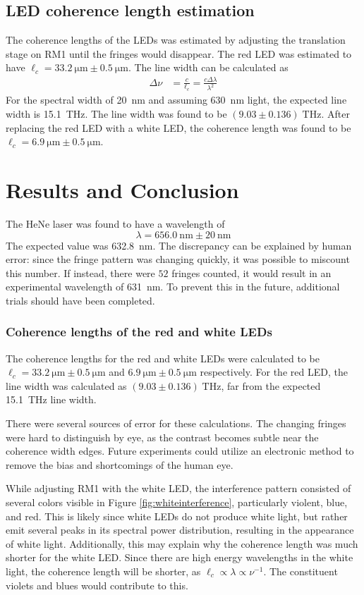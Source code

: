 \documentclass[notitlepage]{report}
\begin{document}
	\subsection{LED coherence length estimation}
	The coherence lengths of the LEDs was estimated by adjusting the translation stage on RM1 until the fringes would disappear. The red LED was estimated to have $\ell_c = \SI{33.2}{\um} \pm \SI{0.5}{\um}$. 
	The line width can be calculated as \begin{align}
		\Delta \nu & = \frac{c}{\ell_c} = \frac{c\Delta \lambda}{\lambda^2} \label{eq:linewidth}
	\end{align}
	For the spectral width of \SI{20}{\nm} and assuming \SI{630}{\nm} light, the expected line width is \SI{15.1}{\THz}. The line width was found to be $(9.03 \pm 0.136) \; \si{\THz}$. After replacing the red LED with a white LED, the coherence length was found to be $\ell_c = \SI{6.9}{\um} \pm \SI{0.5}{\um}$. 
	
	\section{Results and Conclusion}
	The HeNe laser was found to have a wavelength of $$\lambda = \SI{656.0}{\nm} \pm \SI{20}{\nm}$$
	The expected value was \SI{632.8}{\nm}. The discrepancy can be explained by human error: since the fringe pattern was changing quickly, it was possible to miscount this number. If instead, there were $52$ fringes counted, it would result in an experimental wavelength of \SI{631}{\nm}. To prevent this in the future, additional trials should have been completed. 
	
	
	\subsubsection{Coherence lengths of the red and white LEDs}
	The coherence lengths for the red and white LEDs were calculated to be $\ell_c = \SI{33.2}{\um} \pm \SI{0.5}{\um}$ and $\SI{6.9}{\um} \pm \SI{0.5}{\um}$ respectively. For the red LED, the line width was calculated as $(9.03 \pm 0.136) \; \si{\THz}$, far from the expected \SI{15.1}{\THz} line width.
	
	
	There were several sources of error for these calculations. The changing fringes were hard to distinguish by eye, as the contrast becomes subtle near the coherence width edges. Future experiments could utilize an electronic method to remove the bias and shortcomings of the human eye. 
	
	While adjusting RM1 with the white LED, the interference pattern consisted of several colors visible in Figure \ref{fig:whiteinterference}, particularly violent, blue, and red. This is likely since white LEDs do not produce white light, but rather emit several peaks in its spectral power distribution, resulting in the appearance of white light. Additionally, this may explain why the coherence length was much shorter for the white LED. Since there are high energy wavelengths in the white light, the coherence length will be shorter, as $\ell_c \propto \lambda \propto \nu^{-1}$. The constituent violets and blues would contribute to this.
	
\end{document}
